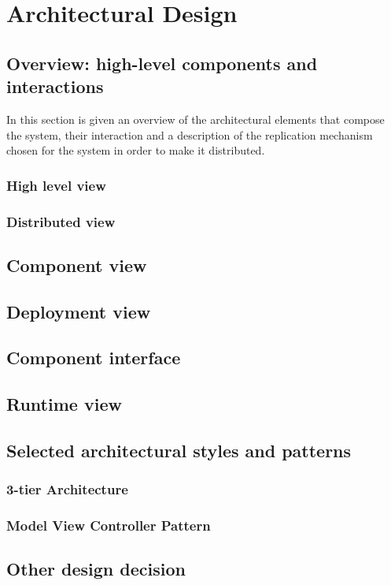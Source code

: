 \chapter{Architectural Design}
\section{Overview: high-level components and interactions}
In this section is given an overview of the architectural elements that compose the system,
their interaction and a description of the replication mechanism chosen for the system in
order to make it distributed.
\subsection{High level view}
\subsection{Distributed view}
\section{Component view}
\section{Deployment view}
\section{Component interface}
\section{Runtime view}
\section{Selected architectural styles
and patterns}
\subsection*{3-tier Architecture}
\subsection*{Model View Controller Pattern}
\section{Other design decision}